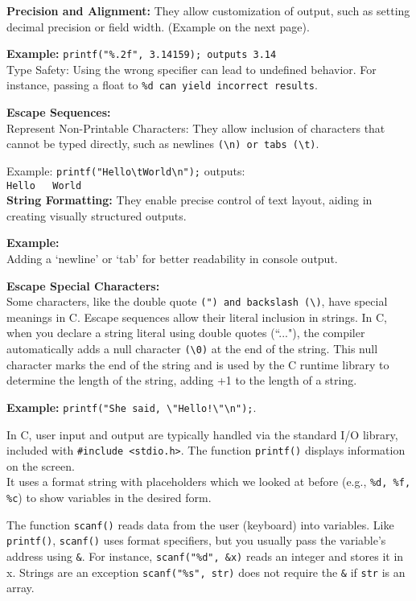 \documentclass[a4paper,12pt]{article}
\begin{document}
\textbf{Precision and Alignment:} They allow customization of output, such as setting decimal precision or field width. (Example on the next page).

\textbf{Example:} \verb|printf("%.2f", 3.14159); outputs 3.14|\\
Type Safety: Using the wrong specifier can lead to undefined behavior. For instance, passing a float to \verb|%d can yield incorrect results|.

\textbf{Escape Sequences:}\\
Represent Non-Printable Characters: They allow inclusion of characters that cannot be typed directly, such as newlines \verb|(\n) or tabs (\t)|.

Example: \verb|printf("Hello\tWorld\n");| outputs:\\
\verb|Hello   World|\\
\textbf{String Formatting:} They enable precise control of text layout, aiding in creating visually structured outputs.

\textbf{Example:}\\
Adding a `newline' or `tab' for better readability in console output.

\textbf{Escape Special Characters:}\\
Some characters, like the double quote \verb|(") and backslash (\)|, have special meanings in C. Escape sequences allow their literal inclusion in strings. In C, when you declare a string literal using double quotes (``..."), the compiler automatically adds a null character \verb|(\0)| at the end of the string. This null character marks the end of the string and is used by the C runtime library to determine the length of the string, adding +1 to the length of a string.

\textbf{Example:} \verb|printf("She said, \"Hello!\"\n");|.

In C, user input and output are typically handled via the standard I/O library,\\ included with \verb|#include <stdio.h>|.
The function \verb|printf()| displays information on the screen.\\
It uses a format string with placeholders which we looked at before (e.g., \verb|%d, %f, %c|) to show variables in the desired form.

The function \verb|scanf()| reads data from the user (keyboard) into variables.
Like \verb|printf()|, \verb|scanf()| uses format specifiers, but you usually pass the variable's address using \verb|&|.
For instance, \verb|scanf("%d", &x)| reads an integer and stores it in x.
Strings are an exception \verb|scanf("%s", str)| does not require the \verb|&| if \verb|str| is an array.
\end{document}
